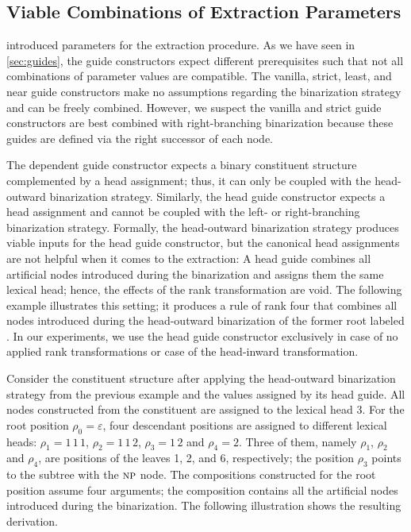 \documentclass[../../document.tex]{subfiles}
\begin{document}
    \subsection{Viable Combinations of Extraction Parameters}\label{sec:viable-paramters}
     introduced parameters for the extraction procedure.
    As we have seen in \cref{sec:guides}, the guide constructors expect different prerequisites such that not all combinations of parameter values are compatible.
    The vanilla, strict, least, and near guide constructors make no assumptions regarding the binarization strategy and can be freely combined.
    However, we suspect the vanilla and strict guide constructors are best combined with right-branching binarization because these guides are defined via the right successor of each node.

    The dependent guide constructor expects a binary constituent structure complemented by a head assignment; thus, it can only be coupled with the head-outward binarization strategy.
    Similarly, the head guide constructor expects a head assignment and cannot be coupled with the left- or right-branching binarization strategy.
    Formally, the head-outward binarization strategy produces viable inputs for the head guide constructor, but the canonical head assignments are not helpful when it comes to the extraction:
        A head guide combines all artificial nodes introduced during the binarization and assigns them the same lexical head; hence, the effects of the rank transformation are void.
    The following example illustrates this setting; it produces a rule of rank four that combines all nodes introduced during the head-outward binarization of the former root labeled .
    In our experiments, we use the head guide constructor exclusively in case of no applied rank transformations or case of the head-inward transformation.

    \begin{wrapfigure}[7]{r}{0pt}
        
    \end{wrapfigure}
    Consider the constituent structure after applying the head-outward binarization strategy from the previous example and the values assigned by its head guide.
    All nodes constructed from the  constituent are assigned to the lexical head \(3\).
    For the root position $\rho_0 = \varepsilon$, four descendant positions are assigned to different lexical heads: $\rho_1 = 1\,1\,1$, $\rho_2=1\,1\,2$, $\rho_3 =1\,2$ and $\rho_4=2$.
    Three of them, namely $\rho_1$, $\rho_2$ and $\rho_4$, are positions of the leaves 1, 2, and 6, respectively; the position \(\rho_3\) points to the subtree with the $\textsc{np}$ node.
    The compositions constructed for the root position assume four arguments; the  composition contains all the artificial nodes introduced during the binarization.
    The following illustration shows the resulting derivation.
    \begin{center}
        
    \end{center}
    \exampleqed
\end{document}

